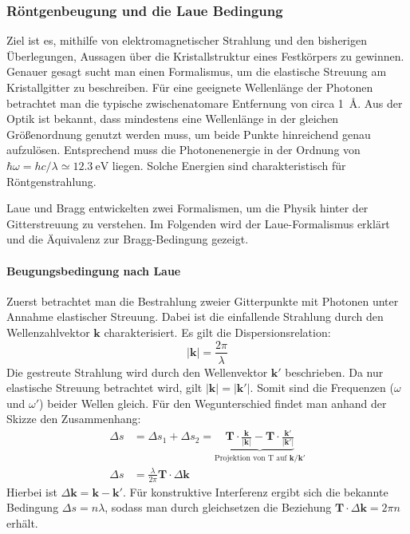 \subsubsection{Röntgenbeugung und die Laue Bedingung}
Ziel ist es, mithilfe von elektromagnetischer Strahlung und den bisherigen Überlegungen, Aussagen über die Kristallstruktur
eines Festkörpers zu gewinnen.
Genauer gesagt sucht man einen Formalismus, um die elastische Streuung am Kristallgitter zu beschreiben.
Für eine geeignete Wellenlänge der Photonen betrachtet man die typische zwischenatomare Entfernung von circa
\qty{1}{\angstrom}.
Aus der Optik ist bekannt, dass mindestens eine Wellenlänge in der gleichen Größenordnung genutzt werden
muss, um beide Punkte hinreichend genau aufzulösen.
Entsprechend muss die Photonenenergie in der Ordnung von
$\hbar \omega=hc / \lambda \simeq \qty{12.3}{\electronvolt}$ liegen.
Solche Energien sind charakteristisch für Röntgenstrahlung.
\autocite[115]{Ashcroft}

Laue und Bragg entwickelten zwei Formalismen, um die Physik hinter der Gitterstreuung zu verstehen. Im Folgenden wird der
Laue-Formalismus erklärt und die Äquivalenz zur Bragg-Bedingung gezeigt.

\paragraph{Beugungsbedingung nach Laue}
Zuerst betrachtet man die Bestrahlung zweier Gitterpunkte mit Photonen unter Annahme elastischer Streuung.
Dabei ist die einfallende Strahlung durch den Wellenzahlvektor  $\mathbf{k}$ charakterisiert.
Es gilt die Dispersionsrelation:
\begin{equation*}
    \lvert \mathbf{k} \rvert =\frac{2\pi}{\lambda}
\end{equation*}
Die gestreute Strahlung wird durch den Wellenvektor $\mathbf{k}'$ beschrieben.
Da nur elastische Streuung betrachtet wird, gilt $\lvert \mathbf{k} \rvert=\lvert \mathbf{k}' \rvert$.
Somit sind die Frequenzen ($\omega$ und $\omega'$) beider Wellen gleich.
Für den Wegunterschied findet man anhand der Skizze den Zusammenhang:
\begin{align*}
    \Delta s &= \Delta s_{1} + \Delta s_{2} = \underbrace{ \mathbf{T} \cdot \frac{\mathbf{k}}{\lvert \mathbf{k} \rvert }-
    \mathbf{T}\cdot \frac{\mathbf{k}'}{\lvert \mathbf{k}' \rvert}  }_{ \text{Projektion von T auf }
    \mathbf{k}/\mathbf{k'} } \\
    \Delta s &=  \frac{\lambda}{2\pi} \mathbf{T}\cdot\Delta \mathbf{k}
\end{align*}
Hierbei ist $\Delta \mathbf{k} = \mathbf{k}-\mathbf{k}'$.
Für konstruktive Interferenz ergibt sich die bekannte Bedingung $\Delta s = n \lambda$, sodass man durch gleichsetzen
die Beziehung $\mathbf{T}\cdot\Delta \mathbf{k} =2\pi n$ erhält.

